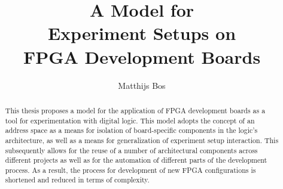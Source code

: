 \documentclass{uva-inf-bachelor-thesis}
\title{A Model for \\Experiment Setups on\\ FPGA Development Boards}
\author{Matthijs Bos}
\begin{document}
\maketitle

\begin{abstract}
This thesis proposes a model for the application of FPGA development boards as a tool for experimentation with digital logic. This model adopts the concept of an address space as a means for isolation of board-specific components in the logic's architecture, as well as a means for generalization of experiment setup interaction. This subsequently allows for the reuse of a number of architectural components across different projects as well as for the automation of different parts of the development process. As a result, the process for development of new FPGA configurations is shortened and reduced in terms of complexity.
\end{abstract}

\tableofcontents
















% 

% 

% 


\cleardoublepage

\restoregeometry


\printbibliography
\end{document}
